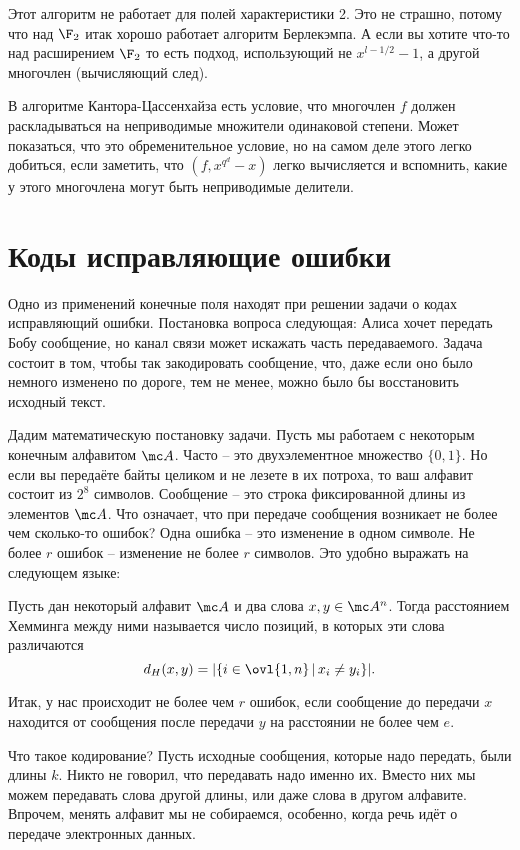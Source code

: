 Этот алгоритм не работает для полей характеристики 2. Это не страшно, потому что над $\F_2$ итак хорошо работает алгоритм Берлекэмпа. А если вы хотите что-то над расширением $\F_2$ то есть подход, использующий не $x^{l-1/2}-1$, а другой многочлен (вычисляющий след). 

В алгоритме Кантора-Цассенхайза есть условие, что многочлен $f$ должен раскладываться на неприводимые множители одинаковой степени. Может показаться, что это обременительное условие, но на самом деле этого легко добиться, если заметить, что $(f,x^{q^d}-x)$ легко вычисляется и вспомнить, какие у этого многочлена могут быть неприводимые делители.


\section{Коды исправляющие ошибки}

Одно из применений конечные поля находят при решении задачи о кодах исправляющий ошибки. Постановка вопроса следующая: Алиса хочет передать Бобу сообщение, но канал связи может искажать часть передаваемого. Задача состоит в том, чтобы так закодировать сообщение, что, даже если оно было немного изменено по дороге, тем не менее, можно было бы восстановить исходный текст.

Дадим математическую постановку задачи. Пусть мы работаем с некоторым конечным алфавитом $\mc A$. Часто -- это двухэлементное множество $\{0,1\}$. Но если вы передаёте байты целиком и не лезете в их потроха, то ваш алфавит состоит из  $2^8$ символов.  Сообщение -- это строка фиксированной длины из элементов $\mc A$. Что означает, что при передаче сообщения возникает не более чем  сколько-то ошибок? Одна ошибка -- это изменение в одном символе. Не более $r$ ошибок -- изменение не более $r$ символов. Это удобно выражать на следующем языке:

 Пусть дан некоторый алфавит $\mc A$ и два слова $x,y \in \mc A^n$. Тогда расстоянием Хемминга между ними называется число позиций, в которых эти слова различаются
$$d_H(x,y)=|\{i \in \ovl{1, n} \, |\, x_i \neq y_i \}|.$$
\edfn

Итак, у нас происходит не более чем $r$ ошибок, если сообщение до передачи $x$ находится от сообщения после передачи $y$ на расстоянии не более чем $e$.

Что такое кодирование? Пусть исходные сообщения, которые надо передать, были длины $k$. Никто не говорил, что передавать надо именно их. Вместо них мы можем передавать слова другой длины, или даже слова в другом алфавите. Впрочем, менять алфавит мы не собираемся, особенно, когда речь идёт о передаче электронных данных. 

